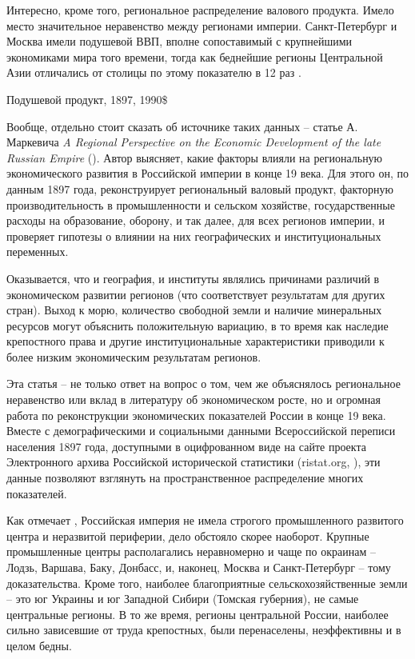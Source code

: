 \documentclass[a4paper,12pt]{article}
\begin{document}
Интересно, кроме того, региональное распределение валового продукта. Имело место значительное неравенство между регионами империи. Санкт-Петербург и Москва имели подушевой ВВП, вполне сопоставимый с крупнейшими экономиками мира того времени, тогда как беднейшие регионы Центральной Азии отличались от столицы по этому показателю в 12 раз \citep{markevich_regional_2019}.

\begin{table}[h]
	\caption{Подушевой продукт, 1897, 1990\$ \citep{markevich_regional_2019}}
	\newcommand{\tableecowidth}{0.5\textwidth}
	
\end{table}

Вообще, отдельно стоит сказать об источнике таких данных -- статье А. Маркевича \emph{A Regional Perspective on the Economic Development of the late Russian Empire} (\citeyear{markevich_regional_2019}).
Автор выясняет, какие факторы влияли на региональную экономического развития в Российской империи в конце 19 века. Для этого он, по данным 1897 года, реконструирует региональный валовый продукт, факторную производительность в промышленности и сельском хозяйстве, государственные расходы на образование, оборону, и так далее, для всех регионов империи, и проверяет гипотезы о влиянии на них географических и институциональных переменных.

Оказывается, что и география, и институты являлись причинами различий в экономическом развитии регионов (что соответствует результатам для других стран). Выход к морю, количество свободной земли и наличие минеральных ресурсов могут объяснить положительную вариацию, в то время как наследие крепостного права и другие институциональные характеристики приводили к более низким экономическим результатам регионов.

Эта статья -- не только ответ на вопрос о том, чем же объяснялось региональное неравенство или вклад в литературу об экономическом росте, но и огромная работа по реконструкции экономических показателей России в конце 19 века. 
Вместе с демографическими и социальными данными Всероссийской переписи населения 1897 года, доступными в оцифрованном виде на сайте проекта Электронного архива Российской исторической статистики (ristat.org, \cite{ristat_2020}), эти данные позволяют взглянуть на пространственное распределение многих показателей.

Как отмечает \citeauthor{markevich_regional_2019}, Российская империя не имела строгого промышленного развитого центра и неразвитой периферии, дело обстояло скорее наоборот. Крупные промышленные центры располагались неравномерно и чаще по окраинам -- Лодзь, Варшава, Баку, Донбасс, и, наконец, Москва и Санкт-Петербург -- тому доказательства. Кроме того, наиболее благоприятные сельскохозяйственные земли -- это юг Украины и юг Западной Сибири (Томская губерния), не самые центральные регионы. В то же время, регионы центральной России, наиболее сильно зависевшие от труда крепостных, были перенаселены, неэффективны и в целом бедны.
\end{document}
